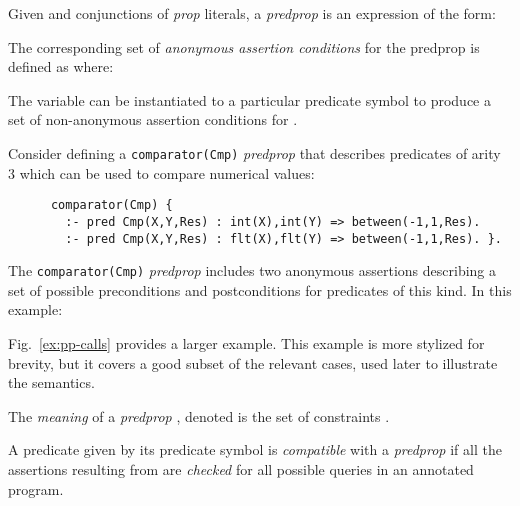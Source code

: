 \documentclass{llncs}
\newcommand{\kbd}[1]{\mbox{\tt #1}}
\newcommand{\skbd}[1]{\mbox{\tt\small{#1}}}
\begin{document}
\begin{definition}[Predprop]
  \label{def:pp-literal}
  Given  and  conjunctions of \emph{prop} literals, a
  \emph{predprop}  is an expression of the form:
  
\end{definition}

\begin{definition}
  \label{def:assrts-mapping}
  The corresponding set of \emph{anonymous assertion conditions}
  for the predprop  is defined as 
   where:
  
The variable  can be instantiated to a particular predicate
  symbol  to produce a set of non-anonymous assertion
  conditions  for .
\end{definition}

\begin{example}
  Consider defining a \skbd{comparator(Cmp)} \emph{predprop} that
  describes predicates of arity 3 which can be used to compare
  numerical values:
  \begin{small}
    \begin{verbatim}
      comparator(Cmp) {
        :- pred Cmp(X,Y,Res) : int(X),int(Y) => between(-1,1,Res).
        :- pred Cmp(X,Y,Res) : flt(X),flt(Y) => between(-1,1,Res). }.
    \end{verbatim}
  \end{small}
The \kbd{comparator(Cmp)} \emph{predprop} includes two anonymous
  assertions describing a set of possible preconditions and
  postconditions for predicates of this kind. In this example:
  \begin{small}
    
  \end{small}
\end{example}

\begin{example}
  Fig.~\ref{ex:pp-calls} provides a larger example. This example
  is more stylized for brevity, but it covers a good subset of the
  relevant cases, 
  used later to illustrate the semantics.
\end{example}

\begin{definition}
  \label{def:pp-meaning}
  The \emph{meaning} of a \emph{predprop} , denoted 
  is the set of constraints 
  .
\end{definition}

A predicate given by its predicate symbol  is
\emph{compatible}
with a \emph{predprop}  if all the assertions resulting from
 are \emph{checked} for all possible queries in an annotated
program.
\end{document}
